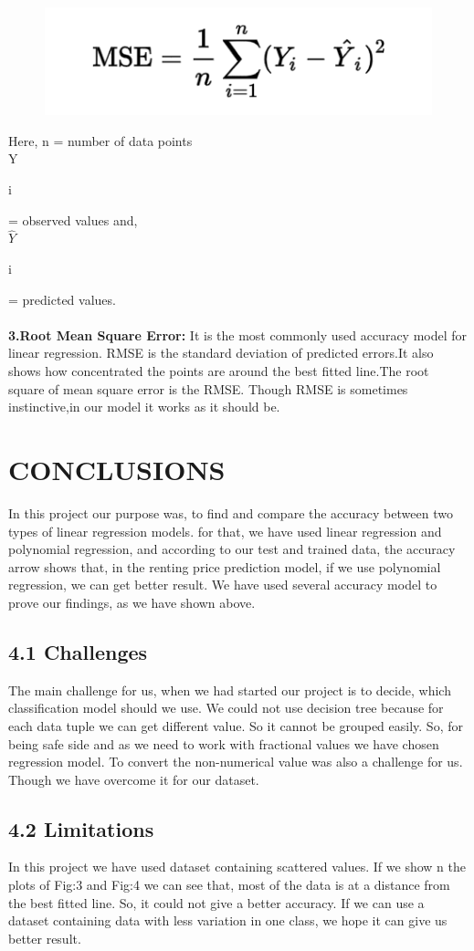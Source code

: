 \documentclass[conference]{IEEEtran}[10]
\begin{document}
\begin{figure}[H]
\centering
\includegraphics[scale=0.4]{mse}
\end{figure}
Here, n = number of data points\\
      Y\begin{footnotesize}
      i
      \end{footnotesize} = observed values and,\\
      $\widehat{Y}$\begin{footnotesize}
      i
      \end{footnotesize} = predicted values.\\
\\      
\textbf{3.Root Mean Square Error:}
It is the most commonly used accuracy model for linear regression. RMSE is the standard deviation of predicted errors.It also shows how concentrated the points are around the best fitted line.The root square of mean square error is the RMSE. Though RMSE is sometimes instinctive,in our model it works as it should be. 
\\
\section{CONCLUSIONS}
In this project our purpose was, to find and compare the accuracy between two types of linear regression models. for that, we have used linear regression and polynomial regression, and according to our test and trained data, the accuracy arrow shows that, in the renting price prediction model, if we use polynomial regression, we can get better result. We have used several accuracy model to prove our findings, as we have shown above.
\subsection{4.1 Challenges}
The main challenge for us, when we had started our project is to decide, which classification model should we use. We could not use decision tree because for each data tuple we can get different value. So it cannot be grouped easily. So, for being safe side and as we need to work with fractional values we have chosen regression model. To convert the non-numerical value was also a challenge for us. Though we have overcome it for our dataset.
\subsection{4.2 Limitations}
In this project we have used dataset containing scattered values. If we show n the plots of Fig:3 and Fig:4 we can see that, most of the data is at a distance from the best fitted line. So, it could not give a better accuracy. If we can use a dataset containing data with less variation in one class, we hope it can give us better result.


\end{document}

